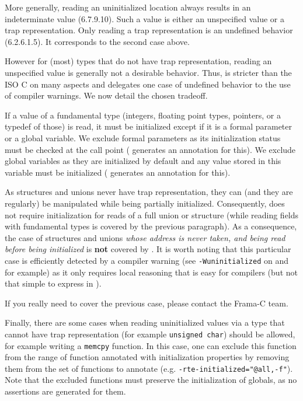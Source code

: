 More generally, reading an uninitialized location always results in an
indeterminate value (\mbox{6.7.9.10}). Such a value is either an unspecified
value or a trap representation. Only reading a trap representation is an
undefined behavior (\mbox{6.2.6.1.5}). It corresponds to the second case above.

However for (most) types that do not have trap representation, reading an
unspecified value is generally not a desirable behavior. Thus, \rte{} is
stricter than the ISO C on many aspects and delegates one case of undefined
behavior to the use of compiler warnings. We now detail the chosen tradeoff.

If a value of a fundamental type (integers, floating point types, pointers, or
a typedef of those) is read, it must be initialized except if it is a formal
parameter or a global variable. We exclude formal parameters as its
initialization status must be checked at the call point (\rte{} generates an
annotation for this). We exclude global variables as they are initialized by
default and any value stored in this variable must be initialized (\rte{}
generates an annotation for this).

As structures and unions never have trap representation, they can (and they are
regularly) be manipulated while being partially initialized. Consequently,
\rte{} does not require initialization for reads of a full union or structure
(while reading fields with fundamental types is covered by the previous paragraph).
As a consequence, the case of structures and unions \textit{whose address is
 never taken, and being read before being initialized} is \textbf{not} covered
by \rte{}. It is worth noting that
this particular case is efficiently detected by a compiler warning (see
\lstinline{-Wuninitialized} on \gcc{} and \clang{} for example) as it only
requires local reasoning that is easy for compilers (but not that simple to
express in \acsl{}).

If you really need \rte{} to cover the previous case, please contact the
Frama-C team.

Finally, there are some cases when reading uninitialized values via a type that
cannot have trap representation (for example \lstinline{unsigned char}) should
be allowed, for example writing a \lstinline{memcpy} function. In this case, one
can exclude this function from the range of function annotated with
initialization properties by removing them from the set of functions to annotate
(e.g. \lstinline{-rte-initialized="@all,-f"}). Note that the excluded functions
must preserve the initialization of globals, as no assertions are generated for
them.

